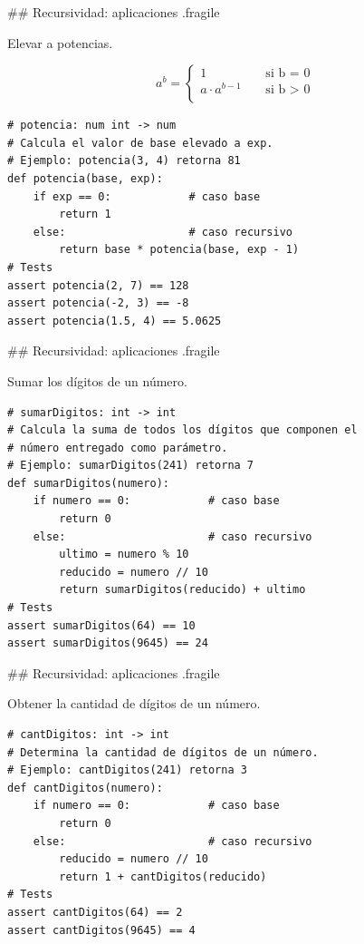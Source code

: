 ## Recursividad: aplicaciones {.fragile}

\bgncolumns
{}
\bgnblockgood
{} Elevar a potencias.
\trmblockgood

\vspace{-7ex}
$$ a^b = \begin{cases}
        1               & \;\;\;\;\text{si b = 0} \\
        a \cdot a^{b-1} & \;\;\;\;\text{si b > 0} \\
    \end{cases}
$$
\trmcolumns

\vspace{3ex}

\begin{lstlisting}[style=frame02]
# potencia: num int -> num
# Calcula el valor de base elevado a exp.
# Ejemplo: potencia(3, 4) retorna 81
def potencia(base, exp):
    if exp == 0:            # caso base
        return 1
    else:                   # caso recursivo
        return base * potencia(base, exp - 1)
# Tests
assert potencia(2, 7) == 128
assert potencia(-2, 3) == -8
assert potencia(1.5, 4) == 5.0625
\end{lstlisting}

## Recursividad: aplicaciones {.fragile}

\bgnblockgood
{} Sumar los dígitos de un número.
\trmblockgood

\pause

\begin{lstlisting}[style=frame02]
# sumarDigitos: int -> int
# Calcula la suma de todos los dígitos que componen el
# número entregado como parámetro.
# Ejemplo: sumarDigitos(241) retorna 7
def sumarDigitos(numero):
    if numero == 0:            # caso base
        return 0
    else:                      # caso recursivo
        ultimo = numero % 10
        reducido = numero // 10
        return sumarDigitos(reducido) + ultimo
# Tests
assert sumarDigitos(64) == 10
assert sumarDigitos(9645) == 24
\end{lstlisting}


## Recursividad: aplicaciones {.fragile}

\bgnblockgood
{} Obtener la cantidad de dígitos de un número.
\trmblockgood

\pause


\begin{lstlisting}[style=frame02]
# cantDigitos: int -> int
# Determina la cantidad de dígitos de un número.
# Ejemplo: cantDigitos(241) retorna 3
def cantDigitos(numero):
    if numero == 0:            # caso base
        return 0
    else:                      # caso recursivo
        reducido = numero // 10
        return 1 + cantDigitos(reducido)
# Tests
assert cantDigitos(64) == 2
assert cantDigitos(9645) == 4
\end{lstlisting}


